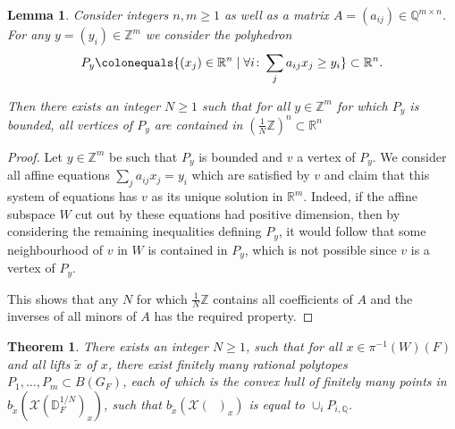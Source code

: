 \documentclass{article}
\newcommand{\BQ}{{\mathbb{Q}}}
\newcommand{\BR}{{\mathbb{R}}}
\newcommand{\BZ}{{\mathbb{Z}}}
\newcommand{\CX}{{\mathcal X}}
\newcommand{\Dr}[1][r]{\mathbb{D}_F^{1/#1}}
\DeclareMathOperator{\Dinfty}{\mathbb{D}_F^{1/\infty}}
\newcommand{\defeq}{\colonequals}
\theoremstyle{definition}
\theoremstyle{plain}
\newtheorem{theorem}[definition]{Theorem}
\newtheorem{lemma}[definition]{Lemma}
\begin{document}
 \begin{lemma} \label{VertexBound}
     Consider integers $n,m \geq 1$ as well as a matrix $A=(a_{ij}) \in \BQ^{m \times n}$. For any $y=(y_i) \in \BZ^m$ we consider the polyhedron
     \begin{equation*}
         P_y \defeq \{ (x_j) \in \BR^n \mid \forall i\colon \sum_j a_{ij} x_j \geq y_i \} \subset \BR^n.
     \end{equation*}

     Then there exists an integer $N \geq 1$ such that for all $y \in \BZ^m$ for which $P_y$ is bounded, all vertices of $P_y$ are contained in $(\frac{1}{N}\BZ)^n \subset \BR^n$
 \end{lemma}
 \begin{proof}
     Let $y \in \BZ^m$ be such that $P_y$ is bounded and $v$ a vertex of $P_y$. We consider all affine equations $\sum_j a_{ij} x_j = y_i$ which are satisfied by $v$ and claim that this system of equations has $v$ as its unique solution in $\BR^m$. Indeed, if the affine subspace $W$ cut out by these equations had positive dimension, then by considering the remaining inequalities defining $P_y$, it would follow that some neighbourhood of $v$ in $W$ is contained in $P_y$, which is not possible since $v$ is a vertex of $P_y$. 

     This shows that any $N$ for which $\frac{1}{N}\BZ$ contains all coefficients of $A$ and the inverses of all minors of $A$ has the required property.
 \end{proof}
\begin{theorem} \label{Polytopes}
    There exists an integer $N \geq 1$, such that for all $x \in \pi^{-1}(W)(F)$ and all lifts $\tilde x$ of $x$, there exist finitely many rational polytopes $P_1, \hdots, P_m \subset B(G_F)$, each of which is the convex hull of finitely many points in $b_{\tilde x}(\CX(\Dr[N])_x)$, such that $b_{\tilde x}(\CX(\Dinfty)_x)$ is equal to $\cup_i P_{i,\BQ}$. 
\end{theorem}
\end{document}

